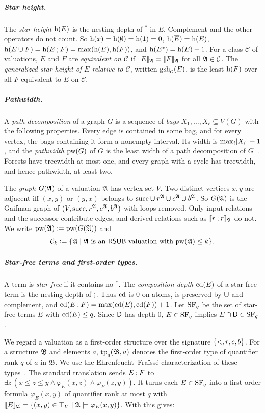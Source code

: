 \subparagraph*{Star height.}
The \emph{star height} $\mathrm{h}(E)$ is the nesting depth of ${}^{*}$ in $E$.
Complement and the other operators do not count.
So $\mathrm{h}(x) = \mathrm{h}(\emptyset) = \mathrm{h}(\mathsf{1}) = 0$, $\mathrm{h}(\overline{E}) = \mathrm{h}(E)$, $\mathrm{h}(E \cup F) = \mathrm{h}(E \mathbin{;} F) = \max(\mathrm{h}(E), \mathrm{h}(F))$, and $\mathrm{h}(E^*) = \mathrm{h}(E) + 1$.
For a class $\mathcal{C}$ of valuations, $E$ and $F$ are \emph{equivalent on $\mathcal{C}$} if $\llbracket E\rrbracket_{\mathfrak{A}} = \llbracket F\rrbracket_{\mathfrak{A}}$ for all $\mathfrak{A} \in \mathcal{C}$.
The \emph{generalized star height of $E$ relative to $\mathcal{C}$}, written $\mathrm{gsh}_{\mathcal{C}}(E)$, is the least $\mathrm{h}(F)$ over all $F$ equivalent to $E$ on $\mathcal{C}$.

\subparagraph*{Pathwidth.}
A \emph{path decomposition} of a graph $G$ is a sequence of \emph{bags} $X_1, \dots, X_\ell \subseteq V(G)$ with the following properties.
Every edge is contained in some bag, and for every vertex, the bags containing it form a nonempty interval.
Its width is $\max_i \lvert X_i\rvert - 1$, and the \emph{pathwidth} $\mathrm{pw}(G)$ of $G$ is the least width of a path decomposition of $G$~\cite{robertsonGraphMinorsExcluding1983}.
Forests have treewidth at most one, and every graph with a cycle has treewidth, and hence pathwidth, at least two.

The \emph{graph} $G(\mathfrak{A})$ of a valuation $\mathfrak{A}$ has vertex set $V$.
Two distinct vertices $x, y$ are adjacent iff $(x, y)$ or $(y, x)$ belongs to $\mathrm{succ} \cup r^{\mathfrak{A}} \cup c^{\mathfrak{A}} \cup b^{\mathfrak{A}}$.
So $G(\mathfrak{A})$ is the Gaifman graph of $(V, \mathrm{succ}, r^{\mathfrak{A}}, c^{\mathfrak{A}}, b^{\mathfrak{A}})$ with loops removed.
Only input relations and the successor contribute edges, and derived relations such as $\llbracket r \mathbin{;} r\rrbracket_{\mathfrak{A}}$ do not.
We write $\mathrm{pw}(\mathfrak{A}) \mathrel{\vcentcolon=} \mathrm{pw}(G(\mathfrak{A}))$ and
\[
  \mathcal{C}_{k} \mathrel{\vcentcolon=} \{\mathfrak{A} \mid \mathfrak{A} \text{ is an $\mathsf{RSUB}$ valuation with } \mathrm{pw}(\mathfrak{A}) \le k\}.
\]

\subparagraph*{Star-free terms and first-order types.}
A term is \emph{star-free} if it contains no ${}^{*}$.
The \emph{composition depth} $\mathrm{cd}(E)$ of a star-free term is the nesting depth of $\mathbin{;}$.
Thus $\mathrm{cd}$ is $0$ on atoms, is preserved by $\cup$ and complement, and $\mathrm{cd}(E \mathbin{;} F) = \max(\mathrm{cd}(E), \mathrm{cd}(F)) + 1$.
Let $\mathrm{SF}_{q}$ be the set of star-free terms $E$ with $\mathrm{cd}(E) \le q$.
Since $\mathsf{D}$ has depth $0$, $E \in \mathrm{SF}_{q}$ implies $E \cap \mathsf{D} \in \mathrm{SF}_{q}$.

We regard a valuation as a first-order structure over the signature $\{<, r, c, b\}$.
For a structure $\mathfrak{B}$ and elements $\bar{a}$, $\mathrm{tp}_{q}(\mathfrak{B}, \bar{a})$ denotes the first-order type of quantifier rank $q$ of $\bar a$ in $\mathfrak{B}$.
We use the Ehrenfeucht--Fra\"iss\'e characterization of these types~\cite{ehrenfeuchtApplicationGamesCompleteness1961,fraisseClassificationsSystemsRelations1954,ebbinghausFiniteModelTheory1995}.
The standard translation sends $E \mathbin{;} F$ to $\exists z\,(x \le z \le y \wedge \varphi_E(x, z) \wedge \varphi_F(z, y))$.
It turns each $E \in \mathrm{SF}_{q}$ into a first-order formula $\varphi_E(x, y)$ of quantifier rank at most $q$ with $\llbracket E\rrbracket_{\mathfrak{A}} = \{(x, y) \in \top_V \mid \mathfrak{A} \models \varphi_E(x, y)\}$.
With  this gives:

